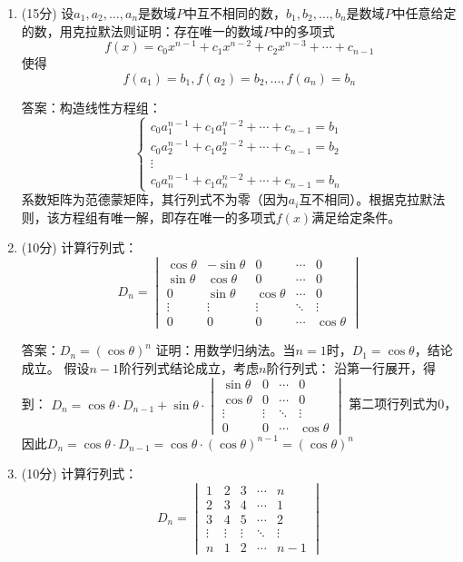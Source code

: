 \documentclass[a4paper,12pt]{article}
\begin{document}
\begin{enumerate}[leftmargin=*]
    \item (15分) 设$a_1, a_2, \ldots, a_n$是数域$P$中互不相同的数，$b_1, b_2, \ldots, b_n$是数域$P$中任意给定的数，用克拉默法则证明：存在唯一的数域$P$中的多项式
    \[
    f(x) = c_0x^{n-1} + c_1x^{n-2} + c_2x^{n-3} + \cdots + c_{n-1}
    \]
    使得
    \[
    f(a_1) = b_1, f(a_2) = b_2, \ldots, f(a_n) = b_n
    \]
    
    答案：构造线性方程组：
    \[
    \begin{cases}
    c_0a_1^{n-1} + c_1a_1^{n-2} + \cdots + c_{n-1} = b_1 \\
    c_0a_2^{n-1} + c_1a_2^{n-2} + \cdots + c_{n-1} = b_2 \\
    \vdots \\
    c_0a_n^{n-1} + c_1a_n^{n-2} + \cdots + c_{n-1} = b_n
    \end{cases}
    \]
    系数矩阵为范德蒙矩阵，其行列式不为零（因为$a_i$互不相同）。根据克拉默法则，该方程组有唯一解，即存在唯一的多项式$f(x)$满足给定条件。
    
    \item (10分) 计算行列式：
    \[
    D_n = \begin{vmatrix}
    \cos\theta & -\sin\theta & 0 & \cdots & 0 \\
    \sin\theta & \cos\theta & 0 & \cdots & 0 \\
    0 & \sin\theta & \cos\theta & \cdots & 0 \\
    \vdots & \vdots & \vdots & \ddots & \vdots \\
    0 & 0 & 0 & \cdots & \cos\theta
    \end{vmatrix}
    \]
    
    答案：$D_n = (\cos\theta)^n$
    证明：用数学归纳法。当$n=1$时，$D_1 = \cos\theta$，结论成立。
    假设$n-1$阶行列式结论成立，考虑$n$阶行列式：
    沿第一行展开，得到：
    $D_n = \cos\theta \cdot D_{n-1} + \sin\theta \cdot \begin{vmatrix}
    \sin\theta & 0 & \cdots & 0 \\
    \cos\theta & 0 & \cdots & 0 \\
    \vdots & \vdots & \ddots & \vdots \\
    0 & 0 & \cdots & \cos\theta
    \end{vmatrix}$
    第二项行列式为0，因此$D_n = \cos\theta \cdot D_{n-1} = \cos\theta \cdot (\cos\theta)^{n-1} = (\cos\theta)^n$
    
    \item (10分) 计算行列式：
    \[
    D_n = \begin{vmatrix}
    1 & 2 & 3 & \cdots & n \\
    2 & 3 & 4 & \cdots & 1 \\
    3 & 4 & 5 & \cdots & 2 \\
    \vdots & \vdots & \vdots & \ddots & \vdots \\
    n & 1 & 2 & \cdots & n-1
    \end{vmatrix}
    \]
    

\end{enumerate}
\end{document}
